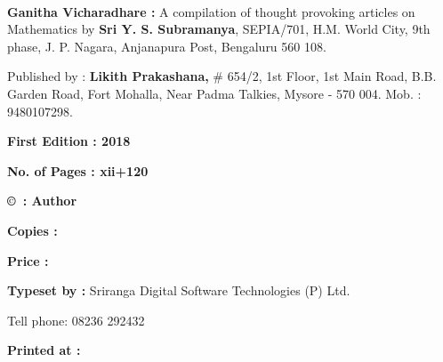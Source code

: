 ~
\thispagestyle{empty}

\noindent
{\rm {\bfseries Ganitha Vicharadhare :} A compilation of thought provoking articles on Mathematics by {\bfseries Sri Y. S. Subramanya}, SEPIA/701, H.M. World City, 9th phase, J. P. Nagara, Anjanapura Post, Bengaluru 560 108.}

\noindent
 {\rm Published by : {\bfseries Likith Prakashana,}  \# 654/2, 1st Floor, 1st Main Road, B.B. Garden Road, Fort Mohalla, Near Padma Talkies, Mysore - 570 004. Mob. : 9480107298.}

\vfill

\begin{center}
{\rm {\bfseries First Edition : 2018}}

\vfill

{\rm {\bfseries No. of Pages : xii+120}}

\vfill

{\rm {\bfseries \copyright ~: Author}}

\vfill

{\rm {\bfseries Copies : }}

\vfill

{\rm {\bfseries Price :  \rupee\ }}


\vfill


{\rm {\bfseries Typeset by :} Sriranga Digital Software Technologies (P) Ltd.}

\noindent
{\rm Tell phone: 08236 292432}

\vfill

{\rm {\bfseries Printed at : }}
\end{center}
\vfill\eject
